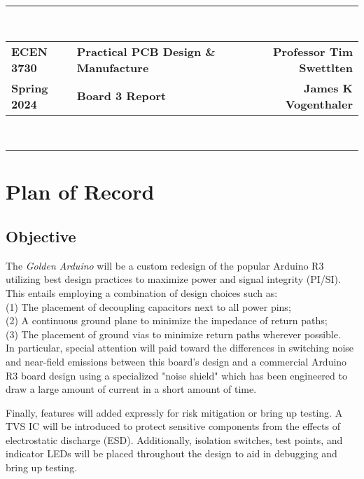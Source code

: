 \documentclass{article}
\newcommand*{\Indent}{\hspace*{1cm}}
\begin{document}
\setlength\parindent{0pt}

\noindent
\rule{\textwidth}{2.5pt}\\
\begin{tabularx}{\textwidth}{>{\bfseries}l >{\bfseries\centering}X >{\bfseries}r}
ECEN 3730   & Practical PCB Design \& Manufacture & Professor Tim Swettlten\\
Spring 2024 & Board 3 Report                      & James K Vogenthaler
\end{tabularx}\\
\rule{\textwidth}{1.5pt}

\section*{Plan of Record}
\subsection*{Objective}
The \textit{Golden Arduino} will be a custom redesign of the popular Arduino R3 utilizing best design practices to maximize power and signal integrity (PI/SI).  This entails employing a combination of design choices such as:
\vspace*{2mm}\\
\Indent (1) The placement of decoupling capacitors next to all power pins;\\
\Indent (2) A continuous ground plane to minimize the impedance of return paths;\\
\Indent (3) The placement of ground vias to minimize return paths wherever possible.
\vspace*{2mm}\\
In particular, special attention will paid toward the differences in switching noise and near-field emissions between this board's design and a commercial Arduino R3 board design using a specialized "noise shield" which has been engineered to draw a large amount of current in a short amount of time.

\Indent Finally, features will added expressly for risk mitigation or bring up testing.
A TVS IC will be introduced to protect sensitive components from the effects of electrostatic discharge (ESD).
Additionally, isolation switches, test points, and indicator LEDs will be placed throughout the design to aid in debugging and bring up testing.
\end{document}
